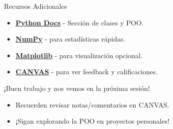 \documentclass[10pt]{beamer}
\begin{document}
\begin{frame}{Recursos Adicionales}
  \begin{itemize}
    \item \href{https://docs.python.org/3/tutorial/classes.html}{\textbf{Python Docs}} - Sección de clases y POO.
    \item \href{https://numpy.org/}{\textbf{NumPy}} - para estadísticas rápidas.
    \item \href{https://matplotlib.org/stable/}{\textbf{Matplotlib}} - para visualización opcional.
    \item \href{https://canvas.instructure.com/}{\textbf{CANVAS}} - para ver feedback y calificaciones.
  \end{itemize}
\end{frame}

\begin{frame}
  \Huge{\centerline{¡Buen trabajo y nos vemos en la próxima sesión!}}
  \vspace{0.5cm}
  \normalsize
  \begin{itemize}
    \item Recuerden revisar notas/comentarios en CANVAS.
    \item ¡Sigan explorando la POO en proyectos personales!
  \end{itemize}
\end{frame}
\end{document}
